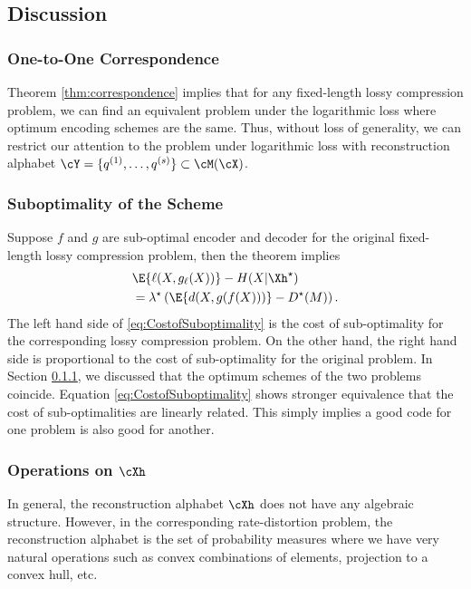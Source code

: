 \documentclass[draftclsnofoot, onecolumn, letterpaper, romanappendices]{IEEEtran}
\begin{document}
\subsection{Discussion}


\subsubsection{One-to-One Correspondence}\label{subsubsec:One-to-One Correspondence}
Theorem \ref{thm:correspondence} implies that for any fixed-length lossy compression problem,
we can find an equivalent problem under the logarithmic loss where optimum encoding schemes are the same.
Thus, without loss of generality, we can restrict our attention to the problem
under logarithmic loss with reconstruction alphabet
$\cY = \{q^{(1)},\ldots,q^{(s)}\}\subset\cM(\cX)$.

\subsubsection{Suboptimality of the Scheme}
Suppose $f$ and $g$ are sub-optimal encoder and decoder for the original fixed-length lossy compression problem,
then the theorem implies
\begin{align}
    &\E{\ell(X,g_\ell(X))} - H(X|\Xh^{\star})\nonumber\\
    &=  \lambda^{\star}\left(\E{d(X,g(f(X)))}-D^{\star}(M)\right)\label{eq:CostofSuboptimality}.
\end{align}
The left hand side of \eqref{eq:CostofSuboptimality} is the cost of sub-optimality
for the corresponding lossy compression problem.
On the other hand, the right hand side is proportional to the cost of sub-optimality
for the original problem.
In Section \ref{subsubsec:One-to-One Correspondence},
we discussed that the optimum schemes of the two problems coincide.
Equation \eqref{eq:CostofSuboptimality} shows stronger equivalence
that the cost of sub-optimalities are linearly related.
This simply implies a good code for one problem is also good for another.

\subsubsection{Operations on $\cXh$}
In general, the reconstruction alphabet $\cXh$ does not have any algebraic structure.
However, in the corresponding rate-distortion problem,
the reconstruction alphabet is the set of probability measures where we have
very natural operations such as convex combinations of elements, projection to a convex hull, etc.
\end{document}
